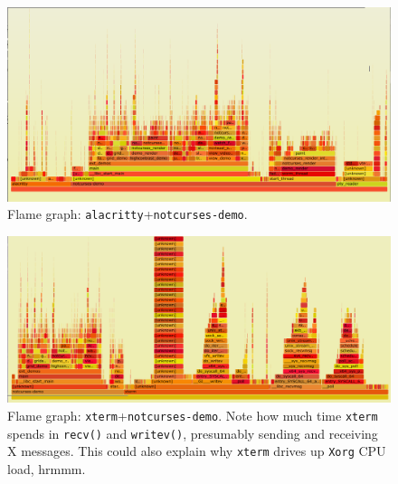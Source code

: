 \begin{figure}[!htb]
\centering
\includegraphics[width=1\textwidth]{media/fg-demo-alacritty.png}
\caption{Flame graph: \texttt{alacritty}+\texttt{notcurses-demo}.}
\label{fig:fg-demo-alacritty}
\end{figure}

\begin{figure}[!htb]
\centering
\includegraphics[width=1\textwidth]{media/fg-demo-xterm.png}
\caption[Flame graph: \texttt{xterm}+\texttt{notcurses-demo}.]
 {Flame graph: \texttt{xterm}+\texttt{notcurses-demo}. Note how much time
   \texttt{xterm} spends in \texttt{recv()} and \texttt{writev()}, presumably
 sending and receiving X messages. This could also explain why \texttt{xterm}
drives up \texttt{Xorg} CPU load, hrmmm\textellipsis .}
\label{fig:fg-demo-xterm}
\end{figure}

